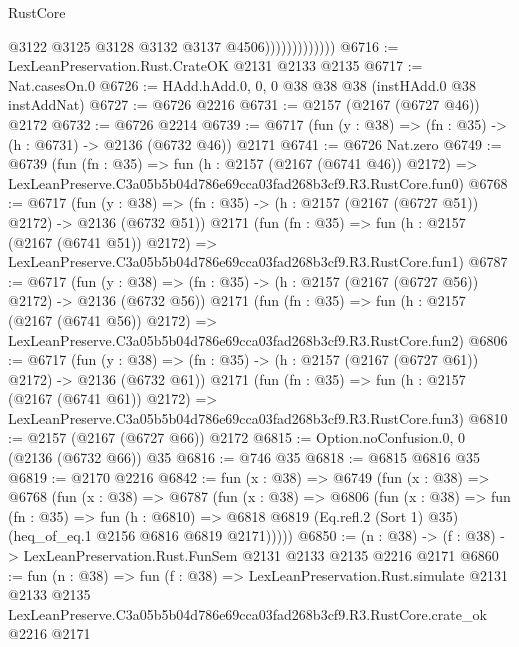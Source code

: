 \begin{lexlean}{RustCore}
\begin{coremodule}
                              @3122
                              @3125
                              @3128
                              @3132
                              @3137
                              @4506)))))))))))))
@6716 := LexLeanPreservation.Rust.CrateOK @2131 @2133 @2135
@6717 := Nat.casesOn.{0}
@6726 := HAdd.hAdd.{0, 0, 0} @38 @38 @38 (instHAdd.{0} @38 instAddNat)
@6727 := @6726 @2216
@6731 := @2157 (@2167 (@6727 @46)) @2172
@6732 := @6726 @2214
@6739 := @6717 (fun (y : @38) => (fn : @35) -> (h : @6731) -> @2136 (@6732 @46)) @2171
@6741 := @6726 Nat.zero
@6749 := @6739
    (fun (fn : @35) =>
    fun (h : @2157 (@2167 (@6741 @46)) @2172) =>
    LexLeanPreserve.C3a05b5b04d786e69cca03fad268b3cf9.R3.RustCore.fun0)
@6768 := @6717
    (fun (y : @38) => (fn : @35) -> (h : @2157 (@2167 (@6727 @51)) @2172) -> @2136 (@6732 @51))
    @2171
    (fun (fn : @35) =>
    fun (h : @2157 (@2167 (@6741 @51)) @2172) =>
    LexLeanPreserve.C3a05b5b04d786e69cca03fad268b3cf9.R3.RustCore.fun1)
@6787 := @6717
    (fun (y : @38) => (fn : @35) -> (h : @2157 (@2167 (@6727 @56)) @2172) -> @2136 (@6732 @56))
    @2171
    (fun (fn : @35) =>
    fun (h : @2157 (@2167 (@6741 @56)) @2172) =>
    LexLeanPreserve.C3a05b5b04d786e69cca03fad268b3cf9.R3.RustCore.fun2)
@6806 := @6717
    (fun (y : @38) => (fn : @35) -> (h : @2157 (@2167 (@6727 @61)) @2172) -> @2136 (@6732 @61))
    @2171
    (fun (fn : @35) =>
    fun (h : @2157 (@2167 (@6741 @61)) @2172) =>
    LexLeanPreserve.C3a05b5b04d786e69cca03fad268b3cf9.R3.RustCore.fun3)
@6810 := @2157 (@2167 (@6727 @66)) @2172
@6815 := Option.noConfusion.{0, 0} (@2136 (@6732 @66)) @35
@6816 := @746 @35
@6818 := @6815 @6816 @35
@6819 := @2170 @2216
@6842 := fun (x : @38) =>
  @6749
    (fun (x : @38) =>
    @6768
      (fun (x : @38) =>
      @6787
        (fun (x : @38) =>
        @6806
          (fun (x : @38) =>
          fun (fn : @35) =>
          fun (h : @6810) =>
          @6818 @6819 (Eq.refl.{2} (Sort 1) @35) (heq_of_eq.{1} @2156 @6816 @6819 @2171)))))
@6850 := (n : @38) -> (f : @38) -> LexLeanPreservation.Rust.FunSem @2131 @2133 @2135 @2216 @2171
@6860 := fun (n : @38) =>
  fun (f : @38) =>
  LexLeanPreservation.Rust.simulate
    @2131
    @2133
    @2135
    LexLeanPreserve.C3a05b5b04d786e69cca03fad268b3cf9.R3.RustCore.crate_ok
    @2216
    @2171
\end{coremodule}
\end{lexlean}
